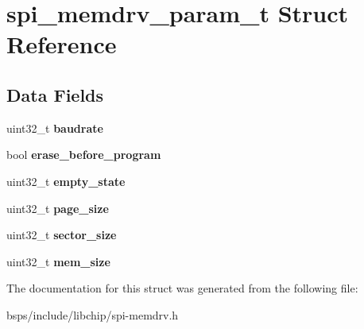\hypertarget{structspi__memdrv__param__t}{}\section{spi\+\_\+memdrv\+\_\+param\+\_\+t Struct Reference}
\label{structspi__memdrv__param__t}
\subsection*{Data Fields}
\begin{DoxyCompactItemize}
\item 
\mbox{\label{structspi__memdrv__param__t_a6eaa69cd61f6e3cc3b33ab8f2c03c00c}} 
uint32\+\_\+t {\bfseries baudrate}
\item 
\mbox{\label{structspi__memdrv__param__t_ac1270fcb623a4fc08a345b18de578206}} 
bool {\bfseries erase\+\_\+before\+\_\+program}
\item 
\mbox{\label{structspi__memdrv__param__t_a8963ebd93d64c94200c7f6b1383cf6c0}} 
uint32\+\_\+t {\bfseries empty\+\_\+state}
\item 
\mbox{\label{structspi__memdrv__param__t_aa155c2777f4bd853a37de316c97e9cb4}} 
uint32\+\_\+t {\bfseries page\+\_\+size}
\item 
\mbox{\label{structspi__memdrv__param__t_a300316defef152d8411f184f645991d1}} 
uint32\+\_\+t {\bfseries sector\+\_\+size}
\item 
\mbox{\label{structspi__memdrv__param__t_ad4c3c8c97df048cfb76f7d54b033a3d1}} 
uint32\+\_\+t {\bfseries mem\+\_\+size}
\end{DoxyCompactItemize}


The documentation for this struct was generated from the following file\+:\begin{DoxyCompactItemize}
\item 
bsps/include/libchip/spi-\/memdrv.\+h\end{DoxyCompactItemize}
